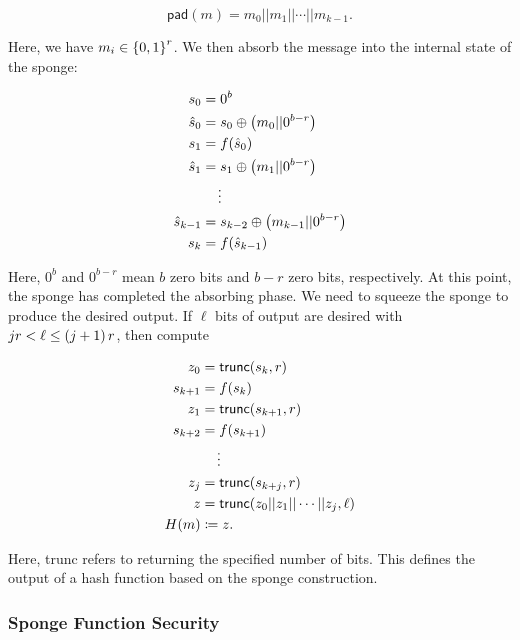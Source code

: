 \begin{equation}
    \textsf{pad}(m) = m_{0}||m_{1}||\cdots||m_{k-1}.
\end{equation}

\noindent
Here, we have $m_{i}\in\left\{ 0,1 \right\}^{r}$.
We then absorb the message into the internal state of the sponge:

\begin{align}
    s_{0} &= 0^{b}
        \nonumber\\
    \hat{s}_{0} &= s_{0} \oplus \left( m_{0}||0^{b-r} \right)
        \nonumber\\
    s_{1} &= f(\hat{s}_{0})
        \nonumber\\
    \hat{s}_{1} &= s_{1} \oplus \left( m_{1}||0^{b-r} \right)
        \nonumber\\
    &\quad \vdots
        \nonumber\\
    \hat{s}_{k-1} &= s_{k-2} \oplus \left( m_{k-1}||0^{b-r} \right)
        \nonumber\\
    s_{k} &= f(\hat{s}_{k-1})
\end{align}

\noindent
Here, $0^{b}$ and $0^{b-r}$ mean $b$ zero bits and $b-r$ zero bits,
respectively.
At this point, the sponge has completed the absorbing phase.
We need to squeeze the sponge to produce the desired output.
If $\ell$ bits of output are desired with $jr < \ell \le \left( j+1 \right)r$,
then compute

\begin{align}
    z_{0} &= \textsf{trunc}(s_{k}, r)
        \nonumber\\
    s_{k+1} &= f(s_{k})
        \nonumber\\
    z_{1} &= \textsf{trunc}(s_{k+1}, r)
        \nonumber\\
    s_{k+2} &= f(s_{k+1})
        \nonumber\\
    &\quad \vdots
        \nonumber\\
    z_{j} &= \textsf{trunc}(s_{k+j}, r)
        \nonumber\\
    z &= \textsf{trunc}(z_{0}||z_{1}||\cdots||z_{j}, \ell)
        \nonumber\\
    H(m) &\coloneqq{} z.
\end{align}

\noindent
Here, \textsf{trunc} refers to returning the
specified number of bits.
This defines the output of a \gls{hash function} based
on the sponge construction.

\subsubsection{Sponge Function Security}

